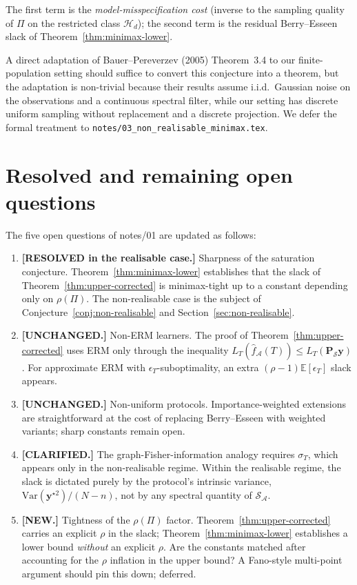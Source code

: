 \documentclass[11pt,a4paper]{article}
\theoremstyle{plain}
\theoremstyle{definition}
\theoremstyle{remark}
\newcommand{\by}{\mathbf{y}}
\newcommand{\bP}{\mathbf{P}}
\newcommand{\E}{\mathbb{E}}
\newcommand{\Var}{\mathrm{Var}}
\newcommand{\Scal}{\mathcal{S}}
\newcommand{\Acal}{\mathcal{A}}
\newcommand{\Hcal}{\mathcal{H}}
\begin{document}
The first term is the \emph{model-misspecification cost} (inverse to
the sampling quality of $\Pi$ on the restricted class $\Hcal_d$); the
second term is the residual Berry--Esseen slack of
Theorem~\ref{thm:minimax-lower}.

A direct adaptation of Bauer--Pereverzev (2005) Theorem~3.4 to our
finite-population setting should suffice to convert this conjecture
into a theorem, but the adaptation is non-trivial because their
results assume i.i.d.\ Gaussian noise on the observations and a
continuous spectral filter, while our setting has discrete uniform
sampling without replacement and a discrete projection.  We defer
the formal treatment to \texttt{notes/03\_non\_realisable\_minimax.tex}.

\section{Resolved and remaining open questions}
\label{sec:status}

The five open questions of notes/01 are updated as follows:

\begin{enumerate}
\item \textbf{[RESOLVED in the realisable case.]} Sharpness of the
    saturation conjecture.  Theorem~\ref{thm:minimax-lower} establishes
    that the slack of Theorem~\ref{thm:upper-corrected} is minimax-tight
    up to a constant depending only on $\rho(\Pi)$.  The non-realisable
    case is the subject of Conjecture~\ref{conj:non-realisable} and
    Section~\ref{sec:non-realisable}.

\item \textbf{[UNCHANGED.]} Non-ERM learners.  The proof of
    Theorem~\ref{thm:upper-corrected} uses ERM only through the
    inequality $L_T(\hat f_\Acal(T)) \leq L_T(\bP_\Scal\by)$.  For
    approximate ERM with $\epsilon_T$-suboptimality, an extra
    $(\rho - 1) \E[\epsilon_T]$ slack appears.

\item \textbf{[UNCHANGED.]} Non-uniform protocols.  Importance-weighted
    extensions are straightforward at the cost of replacing
    Berry--Esseen with weighted variants; sharp constants remain open.

\item \textbf{[CLARIFIED.]} The graph-Fisher-information analogy
    requires $\sigma_T$, which appears only in the non-realisable
    regime.  Within the realisable regime, the slack is dictated
    purely by the protocol's intrinsic variance, $\Var(\by^{\star 2}) / (N-n)$,
    not by any spectral quantity of $\Scal_\Acal$.

\item \textbf{[NEW.]} Tightness of the $\rho(\Pi)$ factor.
    Theorem~\ref{thm:upper-corrected} carries an explicit $\rho$ in the
    slack; Theorem~\ref{thm:minimax-lower} establishes a lower bound
    \emph{without} an explicit $\rho$.  Are the constants matched
    after accounting for the $\rho$ inflation in the upper bound?
    A Fano-style multi-point argument should pin this down; deferred.
\end{enumerate}
\end{document}
